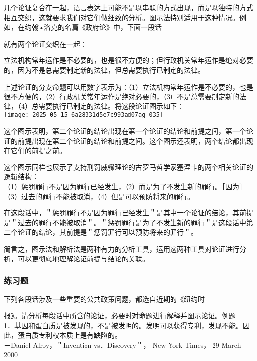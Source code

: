 几个论证复合在一起，语言表达上可能不是以串联的方式出现，而是以独特的方式相互交织，这就要求我们对它们做细致的分析。图示法特别适用于这种情况。例如，在约翰•洛克的名篇《政府论》中，下面一段话

就有两个论证交织在一起：

立法机构常年运作是不必要的，也是很不方便的；但行政机关常年运作是绝对必要的，因为不是总需要制定新的法律，但总需要执行已制定的法律。

上述论证的分支命题可以用数字表示为：（1）立法机构常年运作是不必要的，也是很不方便的，（2）行政机关常年运作是绝对必要的，（3）不是总需要制定新的法律，（4）总需要执行已制定的法律。将这段论证图示如下：\\
\texttt{[image: 2025\_05\_15\_6a28331d5e7c993ad07ag-035]}

这个图示表明，第二个论证的结论出现在第一个论证的结论和前提之间，第一个论证的前提出现在第二个论证的结论和前提之间。这个图示还表明，两个结论都出现在它们的前提之前。

这个图示同样也展示了支持刑罚威骤理论的古罗马哲学家塞涅卡的两个相关论证的逻辑结构：\\
（1）惩罚罪行不是因为罪行已经发生，（2）而是为了不发生新的罪行。［因为］（3）过去的罪行不能被取消，（4）但是可以预防将来的罪行。

在这段话中，＂惩罚罪行不是因为罪行已经发生＂是其中一个论证的结论，其前提是＂过去的罪行不能被取消＂。＂惩罚罪行是为了不发生新的罪行＂是这段话中第二个论证的结论，其前提是＂惩罚罪行可以预防将来的罪行＂。

简言之，图示法和解析法是两种有力的分析工具，运用这两种工具对论证进行分析，可以更彻底地理解论证前提与结论的关联。

\subsubsection{练习题}
下列各段话涉及一些重要的公共政策问题，都选自近期的《纽约时

报》。请分析每段话中所含的论证，必要时对命题进行解释并图示论证。例题\\
1．基因和蛋白质是被发现的，不是被发明的。发明可以获得专利，发现不能。因此，蛋白质专利权本质上是有缺陷的。\\
－Daniel Alroy，＂Invention vs．Discovery＂， New York Times， 29 March 2000

